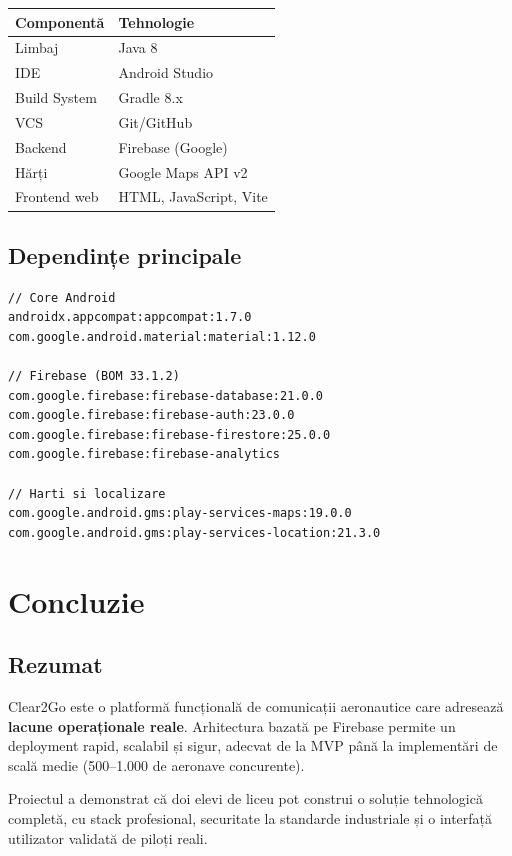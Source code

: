 \documentclass[11pt,a4paper]{report}
\begin{document}
\begin{tabular}{|l|l|}
\hline
\textbf{Componentă} & \textbf{Tehnologie} \\
\hline
Limbaj & Java 8 \\
IDE & Android Studio \\
Build System & Gradle 8.x \\
VCS & Git/GitHub \\
Backend & Firebase (Google) \\
Hărți & Google Maps API v2 \\
Frontend web & HTML, JavaScript, Vite \\
\hline
\end{tabular}

\section{Dependințe principale}

\begin{lstlisting}
// Core Android
androidx.appcompat:appcompat:1.7.0
com.google.android.material:material:1.12.0

// Firebase (BOM 33.1.2)
com.google.firebase:firebase-database:21.0.0
com.google.firebase:firebase-auth:23.0.0
com.google.firebase:firebase-firestore:25.0.0
com.google.firebase:firebase-analytics

// Harti si localizare
com.google.android.gms:play-services-maps:19.0.0
com.google.android.gms:play-services-location:21.3.0
\end{lstlisting}

\chapter{Concluzie}

\section{Rezumat}

Clear2Go este o platformă funcțională de comunicații aeronautice care adresează
\textbf{lacune operaționale reale}. Arhitectura bazată pe Firebase permite
un deployment rapid, scalabil și sigur, adecvat de la MVP până la implementări
de scală medie (500–1.000 de aeronave concurente).

Proiectul a demonstrat că doi elevi de liceu pot construi o soluție tehnologică
completă, cu stack profesional, securitate la standarde industriale și o interfață
utilizator validată de piloți reali.
\end{document}
